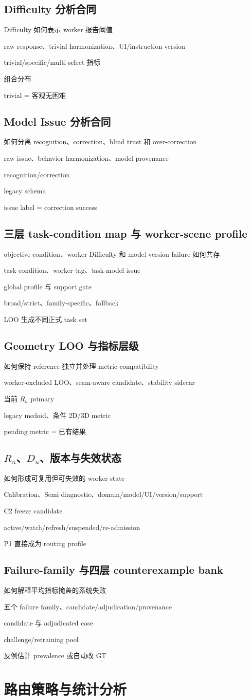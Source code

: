 \documentclass[UTF8,a4paper,12pt]{ctexart}
\newcommand{\card}[5]{%
  \begin{description}[leftmargin=3.3cm,style=nextline]
    \item[回答什么问题：]#1
    \item[使用什么证据：]#2
    \item[Primary：]#3
    \item[Sensitivity / audit：]#4
    \item[禁止主张：]#5
  \end{description}}
\begin{document}
\subsection{Difficulty 分析合同}
\card{Difficulty 如何表示 worker 报告阈值}{raw response、trivial harmonization、UI/instruction version}{trivial/specific/multi-select 指标}{组合分布}{trivial = 客观无困难}
\subsection{Model Issue 分析合同}
\card{如何分离 recognition、correction、blind trust 和 over-correction}{raw issue、behavior harmonization、model provenance}{recognition/correction}{legacy schema}{issue label = correction success}
\subsection{三层 task-condition map 与 worker-scene profile}
\card{objective condition、worker Difficulty 和 model-version failure 如何共存}{task condition、worker tag、task-model issue}{global profile 与 support gate}{broad/strict、family-specific、fallback}{LOO 生成不同正式 task set}
\subsection{Geometry LOO 与指标层级}
\card{如何保持 reference 独立并处理 metric compatibility}{worker-excluded LOO、seam-aware candidate、stability sidecar}{当前 $R_u$ primary}{legacy medoid、条件 2D/3D metric}{pending metric = 已有结果}
\subsection{$R_u$、$D_u$、版本与失效状态}
\card{如何形成可复用但可失效的 worker state}{Calibration、Semi diagnostic、domain/model/UI/version/support}{C2 freeze candidate}{active/watch/refresh/suspended/re-admission}{P1 直接成为 routing profile}
\subsection{Failure-family 与四层 counterexample bank}
\card{如何解释平均指标掩盖的系统失败}{五个 failure family、candidate/adjudication/provenance}{candidate 与 adjudicated case}{challenge/retraining pool}{反例估计 prevalence 或自动改 GT}

\section{路由策略与统计分析}
\end{document}
